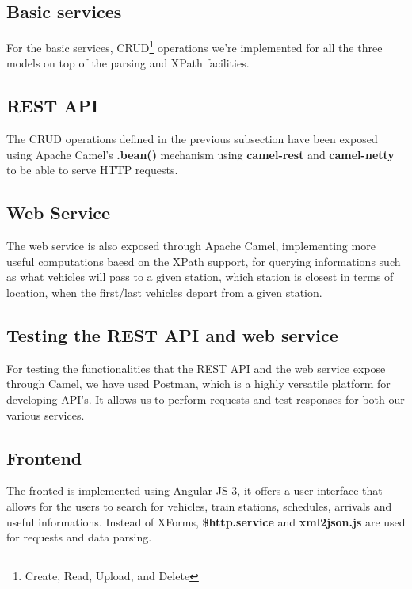 \subsection{Basic services}

For the basic services, CRUD\footnote{Create, Read, Upload, and Delete} operations we're implemented for all the three models on top of the parsing and XPath facilities.

\subsection{REST API}

The CRUD operations defined in the previous subsection have been exposed using Apache Camel's \textbf{.bean()} mechanism using \textbf{camel-rest} and \textbf{camel-netty} to be able to serve HTTP requests.

\subsection{Web Service}

The web service is also exposed through Apache Camel, implementing more useful computations baesd on the XPath support, for querying informations such as what vehicles will pass to a given station, which station is closest in terms of location, when the first/last vehicles depart from a given station.

\subsection{Testing the REST API and web service}

For testing the functionalities that the REST API and the web service expose through Camel, we have used Postman, which is a highly versatile platform for developing API's. It allows us to perform requests and test responses for both our various services.

\subsection{Frontend}

The fronted is implemented using Angular JS 3, it offers a user interface that allows for the users to search for vehicles, train stations, schedules, arrivals and useful informations. Instead of XForms, \textbf{\$http.service} and \textbf{xml2json.js} are used for requests and data parsing.



